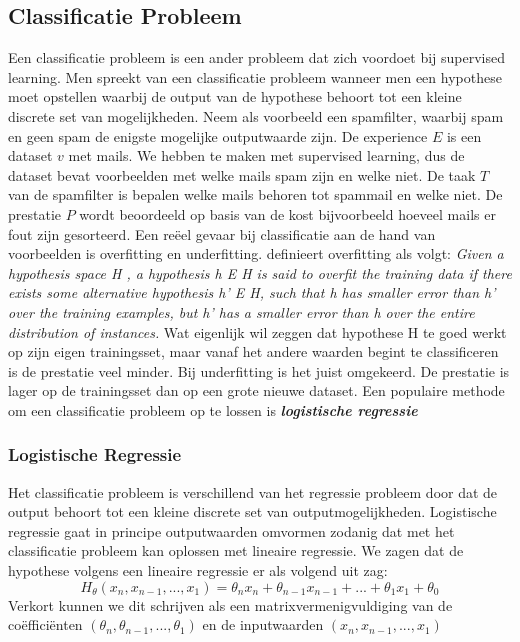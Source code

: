 \subsection{Classificatie Probleem}\label{Classificatie Probleem}

Een classificatie probleem is een ander probleem dat zich voordoet bij supervised learning. Men spreekt van een classificatie probleem wanneer men een hypothese moet opstellen waarbij de output van de hypothese behoort tot een kleine discrete set van mogelijkheden. Neem als voorbeeld een spamfilter, waarbij spam en geen spam de enigste mogelijke outputwaarde zijn. De experience $E$ is een dataset $v$ met mails. We hebben te maken met supervised learning, dus de dataset bevat voorbeelden met welke mails spam zijn en welke niet. De taak $T$ van de spamfilter is bepalen welke mails behoren tot spammail en welke niet. De prestatie $P$ wordt beoordeeld op basis van de kost bijvoorbeeld hoeveel mails er fout zijn gesorteerd.
\newline
Een re\"eel gevaar bij classificatie aan de hand van voorbeelden is overfitting en underfitting.
\citet{mitchell1997machine} definieert overfitting als volgt:
\newline
\newline
\textit{Given a hypothesis space H , a hypothesis h E H is said to overfit the training data if there exists some alternative hypothesis h' E H, such that h has smaller error than h' over the training examples, but h' has a smaller error than h over the entire distribution of instances.}
\newline
\newline
Wat eigenlijk wil zeggen dat hypothese H te goed werkt op zijn eigen trainingsset, maar vanaf het andere waarden begint te classificeren is de prestatie veel minder. Bij underfitting is het juist omgekeerd. De prestatie is lager op de trainingsset dan op een grote nieuwe dataset.
%
Een populaire methode om een classificatie probleem op te lossen is \textbf{\textit{logistische regressie}}

\subsubsection{Logistische Regressie}\label{Logistische Regressie}

Het classificatie probleem is verschillend van het regressie probleem door dat de output behoort tot een kleine discrete set van outputmogelijkheden. Logistische regressie gaat in principe outputwaarden omvormen zodanig dat met het classificatie probleem kan oplossen met lineaire regressie. We zagen dat de hypothese volgens een lineaire regressie er als volgend uit zag:
\[ H_{\theta}(x_{n}, x_{n-1},...,x_{1}) = \theta_{n}x_{n} + \theta_{n-1}x_{n-1} + ... + \theta_{1}x_{1} + \theta_{0}  \] 
%
Verkort kunnen we dit schrijven als een matrixvermenigvuldiging van de co\"effici\"enten $(\theta_{n},\theta_{n-1},...,\theta_{1})$ en de inputwaarden $(x_{n},x_{n-1},...,x_{1})$


